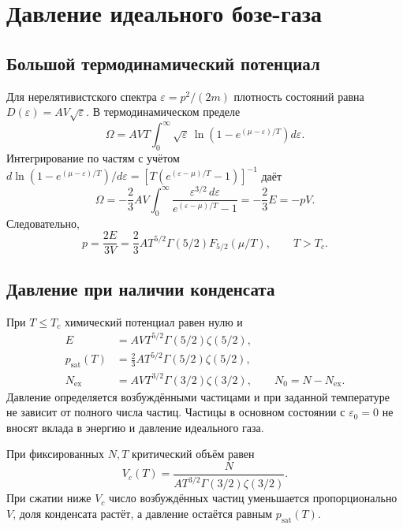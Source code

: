 \documentclass[../final.tex]{subfiles}
\begin{document}
\clearpage
\section{Давление идеального бозе-газа}
\subsection{Большой термодинамический потенциал}
Для нерелятивистского спектра $\varepsilon=p^2/(2m)$
плотность состояний равна $D(\varepsilon)=AV\sqrt\varepsilon$.
В термодинамическом пределе
\begin{equation*}
 \Omega=AVT\int_0^\infty\sqrt\varepsilon\,
 \ln\!\left(1-e^{(\mu-\varepsilon)/T}\right)d\varepsilon.
\end{equation*}
Интегрирование по частям с учётом
$d\ln(1-e^{(\mu-\varepsilon)/T})/d\varepsilon
 =[T(e^{(\varepsilon-\mu)/T}-1)]^{-1}$ даёт
\begin{equation*}
 \Omega=-\frac23AV\int_0^\infty
 \frac{\varepsilon^{3/2}\,d\varepsilon}{e^{(\varepsilon-\mu)/T}-1}
 =-\frac23E=-pV.
\end{equation*}
Следовательно,
\begin{equation*}
 p=\frac{2E}{3V}=\frac23AT^{5/2}\Gamma(5/2)F_{5/2}(\mu/T),\qquad T>T_c.
\end{equation*}

\subsection{Давление при наличии конденсата}
При $T\leq T_c$ химический потенциал равен нулю и
\begin{align*}
 E&=AVT^{5/2}\Gamma(5/2)\zeta(5/2),\\
 p_{\mathrm{sat}}(T)&=\frac23AT^{5/2}\Gamma(5/2)\zeta(5/2),\\
 N_{\mathrm{ex}}&=AVT^{3/2}\Gamma(3/2)\zeta(3/2),\qquad
 N_0=N-N_{\mathrm{ex}}.
\end{align*}
Давление определяется возбуждёнными частицами и при заданной температуре
не зависит от полного числа частиц. Частицы в основном состоянии
с $\varepsilon_0=0$ не вносят вклада в энергию и давление идеального газа.

При фиксированных $N,T$ критический объём равен
\begin{equation*}
 V_c(T)=\frac{N}{AT^{3/2}\Gamma(3/2)\zeta(3/2)}.
\end{equation*}
При сжатии ниже $V_c$ число возбуждённых частиц уменьшается пропорционально $V$,
доля конденсата растёт, а давление остаётся равным $p_{\mathrm{sat}}(T)$.
\end{document}
